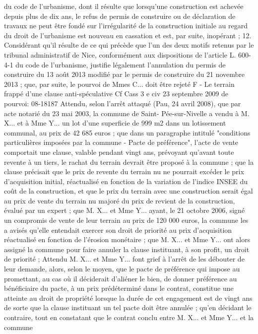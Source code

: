 \documentclass[11pt,a4paper]{report}
\begin{document}
	du code de l'urbanisme, dont il résulte que lorsqu'une construction est achevée depuis plus de dix ans, le refus de
	permis de construire ou de déclaration de travaux ne peut être fondé sur l'irrégularité de la construction initiale
	au regard du droit de l'urbanisme est nouveau en cassation et est, par suite, inopérant ;
	12. Considérant qu'il résulte de ce qui précède que l'un des deux motifs retenus par le tribunal administratif de
	Nice, conformément aux dispositions de l'article L. 600-4-1 du code de l'urbanisme, justifie légalement
	l'annulation du permis de construire du 13 août 2013 modifié par le permis de construire du 21 novembre 2013 ;
	que, par suite, le pourvoi de Mmes C... doit être rejeté
	F - Le terrain frappé d’une clause anti-spéculative
	Cf Cass 3 e civ 23 septembre 2009 \No  de pourvoi: 08-18187
	Attendu, selon l'arrêt attaqué (Pau, 24 avril 2008), que par acte notarié du 23 mai 2003, la commune de Saint-
	Pée-sur-Nivelle a vendu à M. X... et à Mme Y... un lot d'une superficie de 999 m2 dans un lotissement communal,
	au prix de 42 685 euros ; que dans un paragraphe intitulé "conditions particulières imposées par la commune -
	Pacte de préférence", l'acte de vente comportait une clause, valable pendant vingt ans, prévoyant qu'avant toute
	revente à un tiers, le rachat du terrain devrait être proposé à la commune ; que la clause précisait que le prix de
	revente du terrain nu ne pourrait excéder le prix d'acquisition initial, réactualisé en fonction de la variation de
	l'indice INSEE du coût de la construction, et que le prix du terrain avec une construction serait égal au prix de
	vente du terrain nu majoré du prix de revient de la construction, évalué par un expert ; que M. X... et Mme Y...
	ayant, le 21 octobre 2006, signé un compromis de vente de leur terrain au prix de 120 000 euros, la commune
	les a avisés qu'elle entendait exercer son droit de priorité au prix d'acquisition réactualisé en fonction de
	l'érosion monétaire ; que M. X... et Mme Y... ont alors assigné la commune pour faire annuler la clause
	instituant, à son profit, un droit de priorité ;
	Attendu M. X... et Mme Y... font grief à l'arrêt de les débouter de leur demande, alors, selon le moyen, que le
	pacte de préférence qui impose au promettant, au cas où il déciderait d'aliéner le bien, de donner préférence au
	bénéficiaire du pacte, à un prix prédéterminé dans le contrat, constitue une atteinte au droit de propriété lorsque
	la durée de cet engagement est de vingt ans de sorte que la clause instituant un tel pacte doit être annulée ;
	qu'en décidant le contraire, tout en constatant que le contrat conclu entre M. X... et Mme Y... et la commune
\end{document}
